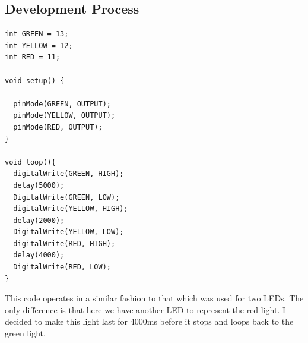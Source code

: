 \documentclass[12pt]{article}
\begin{document}
\subsection{Development Process}
\begin{tcolorbox}[
    enhanced,
    attach boxed title to top left={xshift=6mm,yshift=-3mm},
    colback=lightgreen!20,
    colframe=lightgreen,
    colbacktitle=lightgreen,
    title=Code for a Traffic Light,
    fonttitle=\bfseries\color{black},
    boxed title style={size=small,colframe=lightgreen,sharp corners},
    sharp corners,
]
\begin{verbatim}
int GREEN = 13;
int YELLOW = 12;
int RED = 11;

void setup() {
 
  pinMode(GREEN, OUTPUT);
  pinMode(YELLOW, OUTPUT);
  pinMode(RED, OUTPUT);
}

void loop(){
  digitalWrite(GREEN, HIGH);
  delay(5000);
  DigitalWrite(GREEN, LOW);
  digitalWrite(YELLOW, HIGH);
  delay(2000);
  DigitalWrite(YELLOW, LOW);
  digitalWrite(RED, HIGH);
  delay(4000);
  DigitalWrite(RED, LOW);
}

\end{verbatim}
\end{tcolorbox}
This code operates in a similar fashion to that which was used for two LEDs. The only difference is that here we have another LED to represent the red light. I decided to make this light last for 4000ms before it stops and loops back to the green light. 
\end{document}
